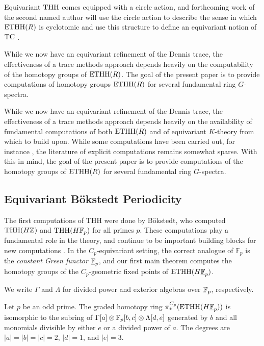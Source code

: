 Equivariant $\mathrm{THH}$ comes equipped with a circle action, and forthcoming work of the second named author will use the circle action to describe the sense in which $\mathrm{ETHH}(R)$ is cyclotomic and use this structure to define an equivariant notion of $\mathrm{TC}$ \cite{Got}.

While we now have an equivariant refinement of the Dennis trace, the effectiveness of a trace methods approach depends heavily on the computability of the homotopy groups of $\mathrm{ETHH}(R)$.  The goal of the present paper is to provide computations of homotopy groups $\mathrm{ETHH}(R)$ for several fundamental ring $G$-spectra.

While we now have an equivariant refinement of the Dennis trace, the effectiveness of a trace methods approach depends heavily on the availability of fundamental computations of both $\mathrm{ETHH}(R)$ and of equivariant $K$-theory from which to build upon.  While some computations have been carried out,  for instance \cite{AGHKK22,ChanVogeli,CW25,Wis26}, the literature of explicit computations remains somewhat sparse. With this in mind, the goal of the present paper is to provide computations of the homotopy groups of $\mathrm{ETHH}(R)$ for several fundamental ring $G$-spectra.

\subsection{Equivariant B\"okstedt Periodicity}

The first computations of THH were done by B\"okstedt, who computed $\mathrm{THH}(H\mathbb{Z})$ and $\mathrm{THH}(H\mathbb{F}_p)$ for all primes $p$. These computations play a fundamental role in the theory, and continue to be important building blocks for new computations \cite{KrauseNikolaus:BokstedtPeriodicity,BhattMorrowScholze}.  In the $C_p$-equivariant setting, the correct analogue of $\mathbb{F}_p$ is the \emph{constant Green functor} $\underline{\mathbb{F}}_p$, and our first main theorem computes the homotopy groups of the $C_p$-geometric fixed points of $\mathrm{ETHH}(H\underline{\mathbb{F}}_p)$.

We write $\Gamma$ and $\Lambda$ for divided power and exterior algebras over $\mathbb{F} _p$, respectively.

\begin{introtheorem}\label{thm:introBokstedt}
    Let $p$ be an odd prime. The graded homotopy ring $\pi^{C_p}_*(\mathrm{ETHH}(H\underline{\mathbb{F}}_p))$ is isomorphic to the subring of $\Gamma[a]\otimes\mathbb{F}_p[b,c]\otimes \Lambda[d,e]$ generated by $b$ and all monomials divisible by either $e$ or a divided power of $a$. The degrees are $|a|=|b|=|c|=2$, $|d|=1$, and $|e|=3$.
\end{introtheorem} 

